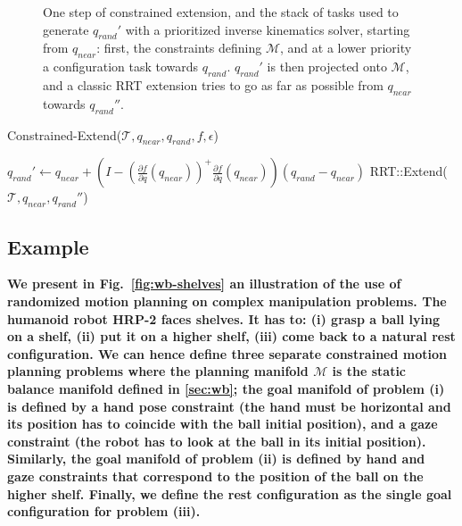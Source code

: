\documentclass{article}
\newcommand\manifold{\mathcal{M}}
\begin{document}
\begin{figure}[h]
\begin{minipage}[c]{0.3\linewidth}
\end{minipage}

\caption{One step of constrained extension, and the stack of tasks used
  to generate $q_{rand}'$ with a prioritized inverse kinematics solver, 
  starting from $q_{near}$:
  first, the constraints defining $\manifold$, and at a lower priority
  a configuration task towards $q_{rand}$.  $q_{rand}'$ is then projected onto
  $\manifold$, and a classic RRT extension tries to go as far as possible
  from $q_{near}$ towards $q_{rand}''$.}
\label{fig:gikrrt}
\end{figure}





\begin{algorithm}[h]
  \caption{Constrained-Extend($\mathcal{T},q_{near},q_{rand},f,\epsilon$)}
  \label{alg:constrained}
  \begin{algorithmic}
    \STATE $q_{rand}' \leftarrow q_{near} +   
    \left(I -  
    \left(\frac{\partial f}{\partial q}(q_{near})\right)^{+}
    \frac{\partial f}{\partial q}(q_{near})\right) (q_{rand} - q_{near})$
    \STATE RRT::Extend($\mathcal{T},q_{near},q_{rand}''$)
    \ENDIF
  \end{algorithmic}
\end{algorithm}







\subsection{Example}

\textbf{We present in Fig.~\ref{fig:wb-shelves} an illustration of the
  use of randomized motion planning on complex manipulation
  problems. The humanoid robot HRP-2 faces shelves. It has to: (i)
  grasp a ball lying on a shelf, (ii) put it on a higher shelf, (iii)
  come back to a natural rest configuration. We can hence define three
  separate constrained motion planning problems where the planning
  manifold $\manifold$ is the static balance manifold defined in
  \ref{sec:wb}; the goal manifold of problem (i) is defined by a hand
  pose constraint (the hand must be horizontal and its position has to
  coincide with the ball initial position), and a gaze constraint (the
  robot has to look at the ball in its initial position). Similarly,
  the goal manifold of problem (ii) is defined by hand and gaze
  constraints that correspond to the position of the ball on the
  higher shelf. Finally, we define the rest configuration as the
  single goal configuration for problem (iii).}
\end{document}
